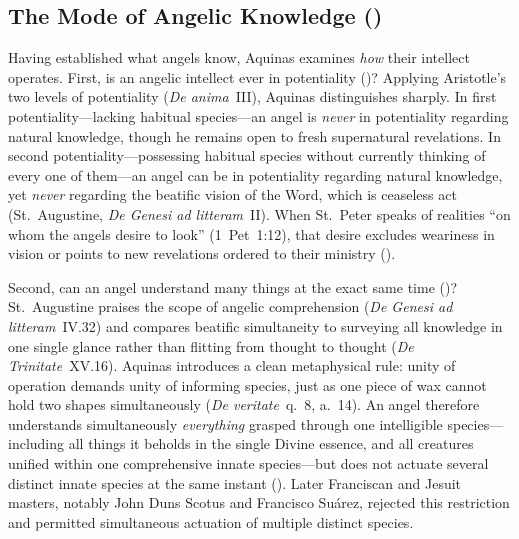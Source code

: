 \subsection{The Mode of Angelic Knowledge ()}

Having established what angels know, Aquinas examines \emph{how} their intellect operates. First, is an angelic intellect ever in potentiality ()? Applying Aristotle's two levels of potentiality (\emph{De anima}~III), Aquinas distinguishes sharply. In first potentiality---lacking habitual species---an angel is \emph{never} in potentiality regarding natural knowledge, though he remains open to fresh supernatural revelations. In second potentiality---possessing habitual species without currently thinking of every one of them---an angel can be in potentiality regarding natural knowledge, yet \emph{never} regarding the beatific vision of the Word, which is ceaseless act (St.~Augustine, \emph{De Genesi ad litteram}~II). When St.~Peter speaks of realities ``on whom the angels desire to look'' (1~Pet~1:12), that desire excludes weariness in vision or points to new revelations ordered to their ministry ().

Second, can an angel understand many things at the exact same time ()? St.~Augustine praises the scope of angelic comprehension (\emph{De Genesi ad litteram}~IV.32) and compares beatific simultaneity to surveying all knowledge in one single glance rather than flitting from thought to thought (\emph{De Trinitate}~XV.16). Aquinas introduces a clean metaphysical rule: unity of operation demands unity of informing species, just as one piece of wax cannot hold two shapes simultaneously (\emph{De veritate}~q.~8, a.~14). An angel therefore understands simultaneously \emph{everything} grasped through one intelligible species---including all things it beholds in the single Divine essence, and all creatures unified within one comprehensive innate species---but does not actuate several distinct innate species at the same instant (). Later Franciscan and Jesuit masters, notably John Duns Scotus and Francisco Su\'arez, rejected this restriction and permitted simultaneous actuation of multiple distinct species.

